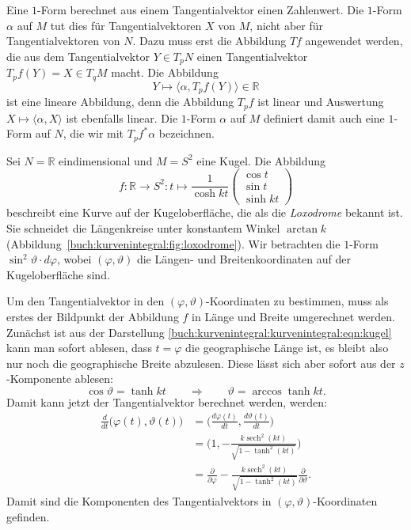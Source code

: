 Eine $1$-Form berechnet aus einem Tangentialvektor einen Zahlenwert.
Die $1$-Form $\alpha$ auf $M$ tut dies für Tangentialvektoren $X$ von
$M$, nicht aber für Tangentialvektoren von $N$.
Dazu muss erst die Abbildung $Tf$ angewendet werden, die aus dem
Tangentialvektor $Y\in T_pN$ einen Tangentialvektor $T_pf(Y)=X\in T_qM$
macht.
Die Abbildung
\[
Y\mapsto \langle \alpha, T_pf(Y)\rangle \in \mathbb{R}
\]
ist eine lineare Abbildung, denn die Abbildung $T_pf$ ist linear und
Auswertung $X\mapsto \langle\alpha,X\rangle$ ist ebenfalls linear.
Die $1$-Form $\alpha$ auf $M$ definiert damit auch eine $1$-Form auf
$N$, die wir mit $T_pf^*\alpha$ bezeichnen.

\begin{beispiel}
\label{buch:kurvenintegral:kurvenintegral:beispiel:loxodrome}
%
Sei $N=\mathbb{R}$ eindimensional und $M=S^2$ eine Kugel.
Die Abbildung 
\begin{equation}
f
\colon
\mathbb{R}\to S^2
:
t
\mapsto 
\frac{1}{\cosh kt}
\begin{pmatrix}
\cos t\\
\sin t\\
\sinh kt
\end{pmatrix}
\label{buch:kurvenintegral:kurvenintegral:eqn:kugel}
\end{equation}
beschreibt eine Kurve auf der Kugeloberfläche, die als die
\emph{Loxodrome} bekannt ist.
%
Sie schneidet die Längenkreise unter konstantem Winkel $\arctan k$
(Abbildung~\ref{buch:kurvenintegral:fig:loxodrome}).
Wir betrachten die $1$-Form $\sin^2\vartheta\cdot d\varphi$, wobei
$(\varphi,\vartheta)$ die Längen- und Breitenkoordinaten auf der
Kugeloberfläche sind.

Um den Tangentialvektor in den $(\varphi,\vartheta)$-Koordinaten zu
bestimmen, muss als erstes der Bildpunkt der Abbildung $f$ in Länge
und Breite umgerechnet werden.
Zunächst ist aus der Darstellung
\eqref{buch:kurvenintegral:kurvenintegral:eqn:kugel}
kann man sofort ablesen, dass $t=\varphi$ die geographische Länge ist,
es bleibt also nur noch die geographische Breite abzulesen.
Diese lässt sich aber sofort aus der $z$-Komponente ablesen:
\[
\cos\vartheta
=
\tanh kt
\qquad\Rightarrow\qquad
\vartheta = \arccos\tanh kt.
\]
Damit kann jetzt der Tangentialvektor berechnet werden, werden:
\begin{align*}
\frac{d}{dt} \bigl(\varphi(t),\vartheta(t)\bigr)
&=
\biggl(
\frac{d\varphi(t)}{dt},
\frac{d\vartheta(t)}{dt}
\biggr)
\\
&=
\biggl(1,
-\frac{k\operatorname{sech}^2(kt)}{\sqrt{1-\tanh^2(kt)}}
\biggr)
\\
&=
\frac{\partial}{\partial \varphi}
-
\frac{k\operatorname{sech}^2(kt)}{\sqrt{1-\tanh^2(kt)}}
\frac{\partial}{\partial\vartheta}
.
\end{align*}
Damit sind die Komponenten des Tangentialvektors in
$(\varphi,\vartheta)$-Koordinaten gefinden.


\end{beispiel}
